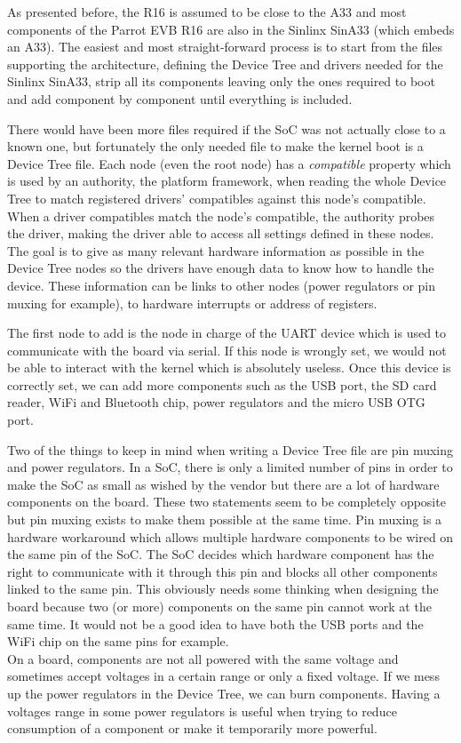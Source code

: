 As presented before, the R16 is assumed to be close to the A33 and most components of the Parrot EVB R16 are also in the Sinlinx SinA33 (which embeds an A33). The easiest and most straight-forward process is to start from the files supporting the architecture, defining the Device Tree and drivers needed for the Sinlinx SinA33, strip all its components leaving only the ones required to boot and add component by component until everything is included.

There would have been more files required if the SoC was not actually close to a known one, but fortunately the only needed file to make the kernel boot is a Device Tree file. Each node (even the root node) has a \textit{compatible} property which is used by an authority, the platform framework, when reading the whole Device Tree to match registered drivers' compatibles against this node's compatible. When a driver compatibles match the node's compatible, the authority probes the driver, making the driver able to access all settings defined in these nodes. The goal is to give as many relevant hardware information as possible in the Device Tree nodes so the drivers have enough data to know how to handle the device. These information can be links to other nodes (power regulators or pin muxing for example), to hardware interrupts or address of registers.

The first node to add is the node in charge of the UART device which is used to communicate with the board via serial. If this node is wrongly set, we would not be able to interact with the kernel which is absolutely useless. Once this device is correctly set, we can add more components such as the USB port, the SD card reader, WiFi and Bluetooth chip, power regulators and the micro USB OTG port.

Two of the things to keep in mind when writing a Device Tree file are pin muxing and power regulators. In a SoC, there is only a limited number of pins in order to make the SoC as small as wished by the vendor but there are a lot of hardware components on the board. These two statements seem to be completely opposite but pin muxing exists to make them possible at the same time. Pin muxing is a hardware workaround which allows multiple hardware components to be wired on the same pin of the SoC. The SoC decides which hardware component has the right to communicate with it through this pin and blocks all other components linked to the same pin. This obviously needs some thinking when designing the board because two (or more) components on the same pin cannot work at the same time. It would not be a good idea to have both the USB ports and the WiFi chip on the same pins for example.\\
On a board, components are not all powered with the same voltage and sometimes accept voltages in a certain range or only a fixed voltage. If we mess up the power regulators in the Device Tree, we can burn components. Having a voltages range in some power regulators is useful when trying to reduce consumption of a component or make it temporarily more powerful.

